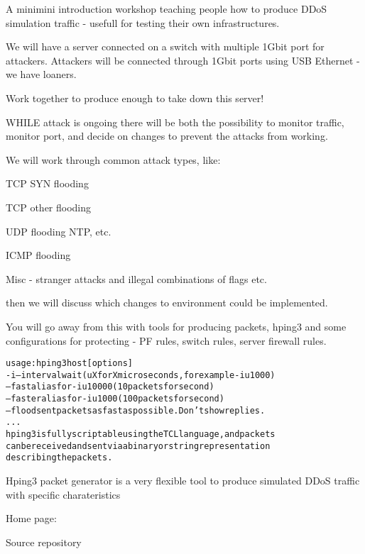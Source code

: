 \documentclass[Screen16to9,17pt]{foils}
\begin{document}

A minimini introduction workshop teaching people how to produce DDoS simulation traffic - usefull for testing their own infrastructures.

We will have a server connected on a switch with multiple 1Gbit port for attackers. Attackers will be connected through 1Gbit ports using USB Ethernet - we have loaners.

Work together to produce enough to take down this server!

WHILE attack is ongoing there will be both the possibility to monitor traffic, monitor port, and decide on changes to prevent the attacks from working.


We will work through common attack types, like:

\begin{list2}
\item TCP SYN flooding
\item TCP other flooding
\item UDP flooding NTP, etc.
\item ICMP flooding
\item Misc - stranger attacks and illegal combinations of flags etc.
\end{list2}

then we will discuss which changes to environment could be implemented.

You will go away from this with tools for producing packets, hping3 and some configurations for protecting - PF rules, switch rules, server firewall rules.





\begin{alltt}\footnotesize
usage: hping3 host [options]
  -i  --interval  wait (uX for X microseconds, for example -i u1000)
      --fast      alias for -i u10000 (10 packets for second)
      --faster    alias for -i u1000 (100 packets for second)
      --flood      sent packets as fast as possible. Don't show replies.
...
hping3 is fully scriptable using the TCL language, and packets
can be received and sent via a binary or string representation
describing the packets.
\end{alltt}

\begin{list2}
\item Hping3 packet generator is a very flexible tool to produce simulated DDoS traffic with specific charateristics
\item Home page: 
\item Source repository 
\end{list2}
\end{document}
